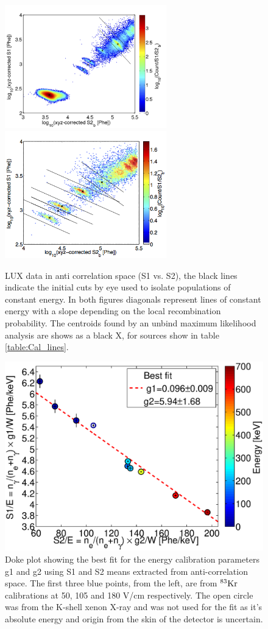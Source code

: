 \begin{figure}[h!]\centering
\includegraphics[width=70mm]{Recombination_LY_QY/Figures/S1S2_density_Kr_Cs_fit.png}
\includegraphics[width=70mm]{Recombination_LY_QY/Figures/S1S2_density_XeA_fit.png}
\caption{LUX data in anti correlation space (S1 vs. S2), the black lines indicate the initial cuts by eye used to isolate populations of constant energy. In both figures diagonals represent lines of constant energy with a slope depending on the local recombination probability. The centroids found by an unbind maximum likelihood analysis are shows as a black X, for sources show in table \ref{table:Cal_lines}. }
\label{fig:S1S2_space}
\end{figure}

 \begin{figure}[h!]\centering
\includegraphics[width=120mm]{Recombination_LY_QY/Figures/S1S2_Doke_1.eps}
\caption{Doke plot showing the best fit for the energy calibration parameters g1 and g2 using S1 and S2 means extracted from anti-correlation space. The first three blue points, from the left, are from $\rm^{83}Kr$ calibrations at 50, 105 and 180 V/cm respectively. The open circle was from the K-shell xenon X-ray and was not used for the fit as it's absolute energy and origin from the skin of the detector is uncertain.}
\label{fig:Doke1}
\end{figure}

